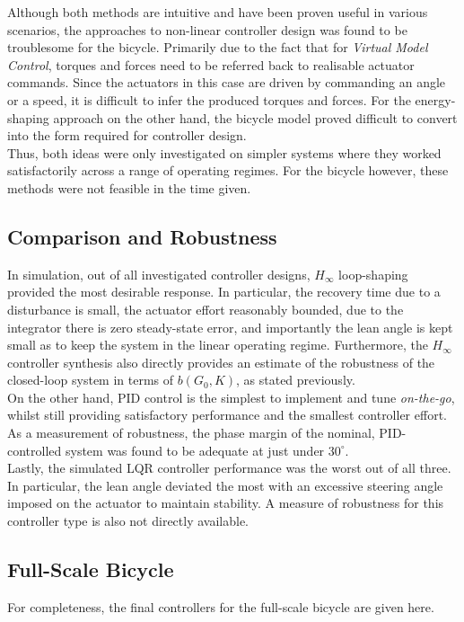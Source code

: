 Although both methods are intuitive and have been proven useful in various scenarios, the approaches to non-linear controller design was found to be troublesome for the bicycle. Primarily due to the fact that for \textit{Virtual Model Control}, torques and forces need to be referred back to realisable actuator commands. Since the actuators in this case are driven by commanding an angle or a speed, it is difficult to infer the produced torques and forces. For the energy-shaping approach on the other hand, the bicycle model proved difficult to convert into the form required for controller design.\\

Thus, both ideas were only investigated on simpler systems where they worked satisfactorily across a range of operating regimes. For the bicycle however, these methods were not feasible in the time given.

\subsection{Comparison and Robustness}
In simulation, out of all investigated controller designs, $H_{\infty}$ loop-shaping provided the most desirable response. In particular, the recovery time due to a disturbance is small, the actuator effort reasonably bounded, due to the integrator there is zero steady-state error, and importantly the lean angle is kept small as to keep the system in the linear operating regime. Furthermore, the $H_{\infty}$ controller synthesis also directly provides an estimate of the robustness of the closed-loop system in terms of $b(G_0,K)$, as stated previously. \\

On the other hand, PID control is the simplest to implement and tune \textit{on-the-go}, whilst still providing satisfactory performance and the smallest controller effort. As a measurement of robustness, the phase margin of the nominal, PID-controlled system was found to be adequate at just under $30^{\circ}$. \\

Lastly, the simulated LQR controller performance was the worst out of all three. In particular, the lean angle deviated the most with an excessive steering angle imposed on the actuator to maintain stability. A measure of robustness for this controller type is also not directly available.

\subsection{Full-Scale Bicycle}
For completeness, the final controllers for the full-scale bicycle are given here. \\


